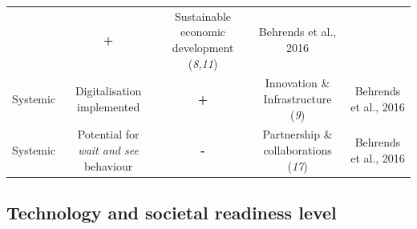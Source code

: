 \documentclass[
]{book}
\begin{document}
\begin{longtable}[]{@{}ccccc@{}}
\begin{minipage}[t]{0.16\columnwidth}
\end{minipage} & \begin{minipage}[t]{0.17\columnwidth}\centering
\textbf{+}\strut
\end{minipage} & \begin{minipage}[t]{0.17\columnwidth}\centering
Sustainable economic development (\emph{8,11})\strut
\end{minipage} & \begin{minipage}[t]{0.17\columnwidth}\centering
Behrends et al., 2016\strut
\end{minipage}\tabularnewline
\begin{minipage}[t]{0.17\columnwidth}\centering
Systemic\strut
\end{minipage} & \begin{minipage}[t]{0.16\columnwidth}\centering
Digitalisation implemented\strut
\end{minipage} & \begin{minipage}[t]{0.17\columnwidth}\centering
\textbf{+}\strut
\end{minipage} & \begin{minipage}[t]{0.17\columnwidth}\centering
Innovation \& Infrastructure (\emph{9})\strut
\end{minipage} & \begin{minipage}[t]{0.17\columnwidth}\centering
Behrends et al., 2016\strut
\end{minipage}\tabularnewline
\begin{minipage}[t]{0.17\columnwidth}\centering
Systemic\strut
\end{minipage} & \begin{minipage}[t]{0.16\columnwidth}\centering
Potential for \emph{wait and see} behaviour\strut
\end{minipage} & \begin{minipage}[t]{0.17\columnwidth}\centering
\textbf{-}\strut
\end{minipage} & \begin{minipage}[t]{0.17\columnwidth}\centering
Partnership \& collaborations (\emph{17})\strut
\end{minipage} & \begin{minipage}[t]{0.17\columnwidth}\centering
Behrends et al., 2016\strut
\end{minipage}\tabularnewline
\bottomrule
\end{longtable}

\hypertarget{technology-and-societal-readiness-level-21}{%
\subsection*{Technology and societal readiness level}\label{technology-and-societal-readiness-level-21}}
\end{document}

